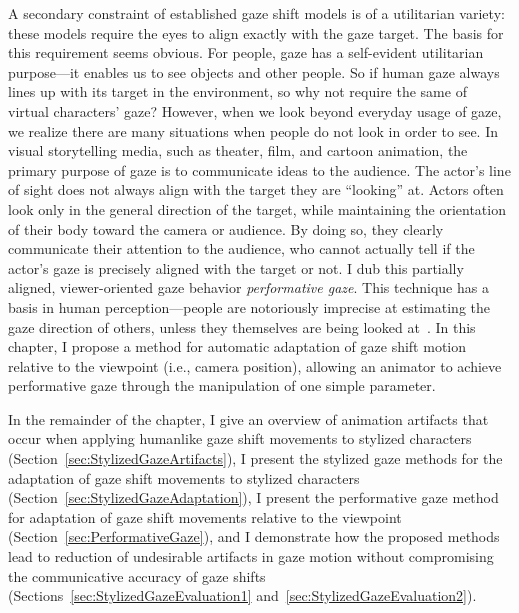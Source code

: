 A secondary constraint of established gaze shift models is of a utilitarian variety: these models require the eyes to align exactly with the gaze target. The basis for this requirement seems obvious. For people, gaze has a self-evident utilitarian purpose---it enables us to see objects and other people. So if human gaze always lines up with its target in the environment, so why not require the same of virtual characters' gaze?
However, when we look beyond everyday usage of gaze, we realize there are many situations when people do not look in order to see.
In visual storytelling media, such as theater, film, and cartoon animation, the primary purpose of gaze is to communicate ideas to the audience. The actor's line of sight does not always align with the target they are ``looking'' at. Actors often look only in the general direction of the target, while maintaining the orientation of their body toward the camera or audience. By doing so, they clearly communicate their attention to the audience, who cannot actually tell if the actor's gaze is precisely aligned with the target or not.
I dub this partially aligned, viewer-oriented gaze behavior \emph{performative gaze}. This technique has a basis in human perception---people are notoriously imprecise at estimating the gaze direction of others, unless they themselves are being looked at~\citep{argyle1976gaze}. In this chapter, I propose a method for automatic adaptation of gaze shift motion relative to the viewpoint (i.e., camera position), allowing an animator to achieve performative gaze through the manipulation of one simple parameter.

In the remainder of the chapter, I give an overview of animation artifacts that occur when applying humanlike gaze shift movements to stylized characters (Section~\ref{sec:StylizedGazeArtifacts}), I present the stylized gaze methods for the adaptation of gaze shift movements to stylized characters (Section~\ref{sec:StylizedGazeAdaptation}), I present the performative gaze method for adaptation of gaze shift movements relative to the viewpoint (Section~\ref{sec:PerformativeGaze}), and I demonstrate how the proposed methods lead to reduction of undesirable artifacts in gaze motion without compromising the communicative accuracy of gaze shifts (Sections~\ref{sec:StylizedGazeEvaluation1} and~\ref{sec:StylizedGazeEvaluation2}). 
